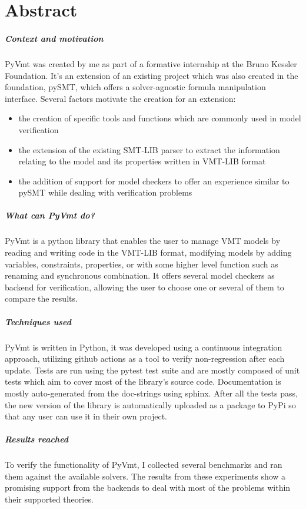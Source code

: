 \chapter*{Abstract}
\label{abstract}


\paragraph*{Context and motivation}
PyVmt was created by me as part of a formative internship at the Bruno Kessler Foundation. It's an extension of an existing project which was also created in the foundation, pySMT, which offers a solver-agnostic formula manipulation interface.
Several factors motivate the creation for an extension:
\begin{itemize}
  \item the creation of specific tools and functions which are commonly used in model verification
  \item the extension of the existing SMT-LIB parser to extract the information relating to the model and its properties written in VMT-LIB format
  \item the addition of support for model checkers to offer an experience similar to pySMT while dealing with verification problems
\end{itemize}

\paragraph*{What can PyVmt do?}
PyVmt is a python library that enables the user to manage VMT models by reading and writing code in the VMT-LIB format, modifying models by adding variables, constraints, properties, or with some higher level function such as renaming and synchronous combination. It offers several model checkers as backend for verification, allowing the user to choose one or several of them to compare the results.

\paragraph*{Techniques used}
PyVmt is written in Python, it was developed using a continuous integration approach, utilizing github actions as a tool to verify non-regression after each update.
Tests are run using the pytest test suite and are mostly composed of unit tests which aim to cover most of the library's source code.
Documentation is mostly auto-generated from the doc-strings using sphinx.
After all the tests pass, the new version of the library is automatically uploaded as a package to PyPi so that any user can use it in their own project.

\paragraph*{Results reached}
To verify the functionality of PyVmt, I collected several benchmarks and ran them against the available solvers. The results from these experiments show a promising support from the backends to deal with most of the problems within their supported theories.
